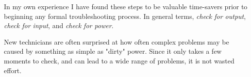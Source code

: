 





In my own experience I have found these steps to be valuable time-savers prior to beginning any formal troubleshooting process.  In general terms, {\it check for output}, {\it check for input}, and {\it check for power}.  

New technicians are often surprised at how often complex problems may be caused by something as simple as "dirty" power.  Since it only takes a few moments to check, and can lead to a wide range of problems, it is not wasted effort.




